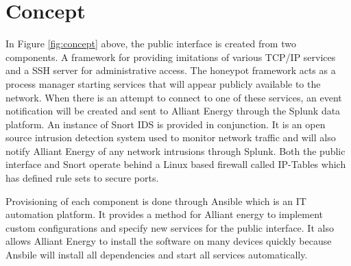 \section*{\color{NavyBlue}Concept}

\large

\begin{center}
{
\scalebox{1.65}{}
}
\label{fig:concept}

\end{center}
\vspace{2cm}

In Figure \ref{fig:concept} above, the public interface is created from two components.  A framework for providing imitations of various TCP/IP services and a SSH server for administrative access. The honeypot framework acts as a process manager starting services that will appear publicly available to the network. When there is an attempt to connect to one of these services, an event notification will be created and sent to Alliant Energy through the Splunk data platform. An instance of Snort IDS is provided in conjunction. It is an open source intrusion detection system used to monitor network traffic and will also notify Alliant Energy of any network intrusions through Splunk. Both the public interface and Snort operate behind a Linux based firewall called IP-Tables which has defined rule sets to secure ports.

Provisioning of each component is done through Ansible which is an IT automation platform. It provides a method for Alliant energy to implement custom configurations and specify new services for the public interface. It also allows Alliant Energy to install the software on many devices quickly because Ansbile will install all dependencies and start all services automatically.